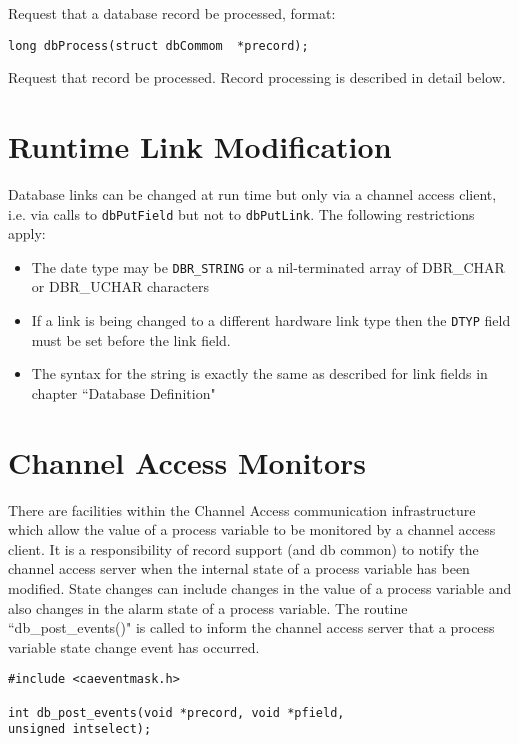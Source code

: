 Request that a database record be processed, format:

\begin{verbatim}
long dbProcess(struct dbCommom  *precord);
\end{verbatim}

Request that record be processed. Record processing is described in detail below.

\section{Runtime Link Modification}

Database links can be changed at run time but only via a channel access client, i.e. via calls to \verb|dbPutField| but not to 
\verb|dbPutLink|. The following restrictions apply:

\begin{itemize}
\item The date type may be \verb|DBR_STRING| or a nil-terminated array of DBR\_CHAR or DBR\_UCHAR characters

\item If a link is being changed to a different hardware link type then the \verb|DTYP| field must be set before the link field.

\item The syntax for the string is exactly the same as described for link fields in chapter ``Database Definition"

\end{itemize}

\section{Channel Access Monitors}

There are facilities within the Channel Access communication infrastructure which allow the value of a process variable 
to be monitored by a channel access client. It is a responsibility of record support (and db common) to notify the channel 
access server when the internal state of a process variable has been modified. State changes can include changes in the 
value of a process variable and also changes in the alarm state of a process variable. The routine ``db\_post\_events()" is 
called to inform the channel access server that a process variable state change event has occurred.

\begin{verbatim}
#include <caeventmask.h>

int db_post_events(void *precord, void *pfield,
unsigned intselect);
\end{verbatim}


